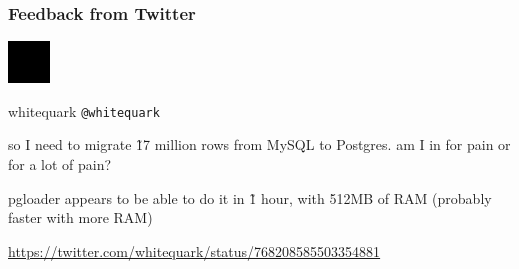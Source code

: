 \documentclass[xcolor=dvipsnames]{beamer}
\begin{document}
{

  \begin{frame}[fragile]
    \frametitle{Feedback from Twitter}

    \begin{center}
      \begin{minipage}{0,6\textwidth}
        \begin{minipage}{0,2\textwidth}
          \includegraphics[height=3em]{whitequark.png}
        \end{minipage}
        \begin{minipage}{0,8\textwidth}
          whitequark \newline
          \texttt{@whitequark}
        \end{minipage}
      \end{minipage}
      \rule[10pt]{0,6\textwidth}{1px}
      
      \begin{minipage}{0,6\textwidth}
        \begin{Large}
          so I need to migrate \~ 17 million rows from MySQL to Postgres. am I
          in for pain or for a lot of pain?
        \end{Large}
      \end{minipage}
      \rule[10pt]{0,6\textwidth}{1px}

      \begin{minipage}{0,6\textwidth}
        \begin{Large}
          pgloader appears to be able to do it in \~ 1 hour, with 512MB of
          RAM (probably faster with more RAM)
        \end{Large}
      \end{minipage}
      \rule{0,6\textwidth}{1px}

      \vfill
      \url{https://twitter.com/whitequark/status/768208585503354881}
    \end{center}
    
  \end{frame}
}
\end{document}
